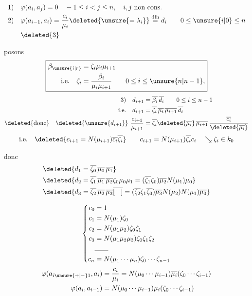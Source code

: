 \[
\begin{aligned}
1)\quad &\varphi(a_i,a_j)=0\quad -1\leq i<j\leq n,\quad i,j\text{ non cons.}\\
2)\quad &\varphi(a_{i-1},a_i)=\frac{c_i}{\mu_i}\deleted{\unsure{=\lambda_i}}\overset{\mathrm{dfn}}=d_i\qquad0\leq\unsure{i|0}\leq n\\
&\deleted{3}
\end{aligned}
\]


posons
\[
\boxed{\begin{aligned}
\beta_{\unsure{i|r}}&=\zeta_i\mu_i\mu_{i+1}\\
\text{i.e.}\quad \zeta_i&=\frac{\beta_i}{\mu_i\mu_{i+1}}
\qquad 0\leq i\leq\unsure{n|n-1},
\end{aligned}}
\]
\[
\begin{aligned}
3)\quad d_{i+1}&=\overline{\beta_i}\,\overline{d_i}\qquad 0\leq i\leq n-1\\
\text{i.e.}\quad d_{i+1}&=\overline{\zeta_i}\,\overline{\mu_i}\,\overline{\mu_{i+1}}\,\overline{d_i}\\
\text{\deleted{donc}}\quad\deleted{\unsure{d_{i+1}}}\ \frac{c_{i+1}}{\mu_{i+1}}&=
\overline{\zeta_i}\deleted{\overline{\mu_i}}\,\overline{\mu_{i+1}}\,\frac{\overline{c_i}}{\deleted{\overline{\mu_i}}}
\end{aligned}
\]
\[
\text{i.e.}\quad\deleted{c_{i+1}=N(\mu_{i+1})\overline{c_i}\overline{\zeta_i}}\qquad
 c_{i+1}=N(\mu_{i+1})\overline{\zeta_i}c_i\quad\searrow\zeta_i\in k_0
\]

donc
\[
\begin{aligned}
&\deleted{d_1=\overline{\zeta_0}\,\overline{\mu_0}\,\overline{\mu_1}}\\
&\deleted{d_2=\overline{\zeta_1}\,\overline{\mu_1}\,\overline{\mu_2}\zeta_0\mu_0\mu_1
=(\overline{\zeta_1}\zeta_0)\overline{\mu_2}N(\mu_1)\mu_0}\\
&\deleted{d_3=\overline{\zeta_2}\,\overline{\mu_2}\,\overline{\mu_3}\overline{[\,\phantom{x}\,]}
=(\overline{\zeta_2}\zeta_1\overline{\zeta_0})\overline{\mu_3}N(\mu_2)N(\mu_1)\overline{\mu_0}}
\end{aligned}
\]

\[
\left\{\begin{aligned}
c_0&=1\\
c_1&=N(\mu_1)\zeta_0\\
c_2&=N(\mu_1\mu_2)\zeta_0\zeta_1\\
c_3&=N(\mu_1\mu_2\mu_3)\zeta_0\zeta_1\zeta_2\\
&\hbox to 2em{\hrulefill}\\
c_n&=N(\mu_1\cdots\mu_n)\zeta_0\cdots\zeta_{n-1}
\end{aligned}\right.
\]
\[
\begin{aligned}
\varphi(a_{i\unsure{+|-}1},a_i)&=\frac{c_i}{\mu_i}=N(\mu_0\cdots\mu_{i-1})\overline{\mu_i}(\zeta_0\cdots\zeta_{i-1})\\
\varphi(a_i,a_{i-1})&=N(\mu_0\cdots\mu_{i-1})\mu_i(\zeta_0\cdots\zeta_{i-1})
\end{aligned}
\]

